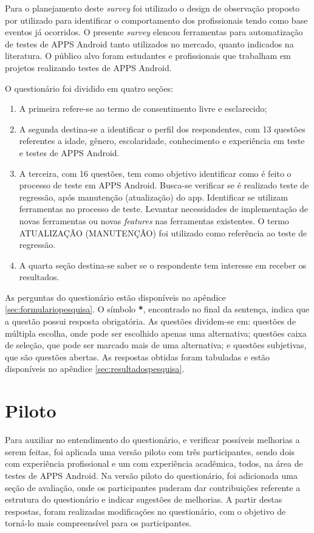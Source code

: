Para o planejamento deste \textit{survey} foi utilizado o design de observação proposto por \cite{Kitchenham:2002:PSR:566493.566495} utilizado para identificar o comportamento dos profissionais tendo como base eventos já ocorridos. O presente \textit{survey} elencou ferramentas para automatização de testes de \ac{APPS} Android tanto utilizados no mercado, quanto indicados na literatura. O público alvo foram estudantes e profissionais que trabalham em projetos realizando testes de \ac{APPS} Android. 

O questionário foi dividido em quatro seções:
\begin{enumerate}
    \item A primeira refere-se ao termo de consentimento livre e esclarecido;
    \item A segunda destina-se a identificar o perfil dos respondentes, com 13 questões referentes a idade, gênero, escolaridade, conhecimento e experiência em teste e testes de \ac{APPS} Android.
    \item A terceira, com 16 questões, tem como objetivo identificar como é feito o processo de teste em \ac{APPS} Android. Busca-se verificar se é realizado teste de regressão, após manutenção (atualização) do app. Identificar se utilizam ferramentas no processo de teste. Levantar necessidades de implementação de novas ferramentas ou novas \textit{features} nas ferramentas existentes. O termo ATUALIZAÇÃO (MANUTENÇÃO) foi utilizado como referência ao teste de regressão.
    \item A quarta seção destina-se saber se o respondente tem interesse em receber os resultados.
\end{enumerate}

As perguntas do questionário estão disponíveis no apêndice \ref{sec:formulariopesquisa}. O símbolo \textbf{*}, encontrado no final da sentença, indica que a questão possui resposta obrigatória. As questões dividem-se em: questões de múltipla escolha, onde pode ser escolhido apenas uma alternativa; questões caixa de seleção, que pode ser marcado mais de uma alternativa; e questões subjetivas, que são questões abertas. As respostas obtidas foram tabuladas e estão disponíveis no apêndice \ref{sec:resultadospesquisa}. 

\section{Piloto}

Para auxiliar no entendimento do questionário, e verificar possíveis melhorias a serem feitas, foi aplicada uma versão piloto com três participantes, sendo dois com experiência profissional e um com experiência acadêmica, todos, na área de testes de \ac{APPS} Android. Na versão piloto do questionário, foi adicionada uma seção de avaliação, onde os participantes puderam dar contribuições referente a estrutura do questionário e indicar sugestões de melhorias. A partir destas respostas, foram realizadas modificações no questionário, com o objetivo de torná-lo mais compreensível para os participantes.


